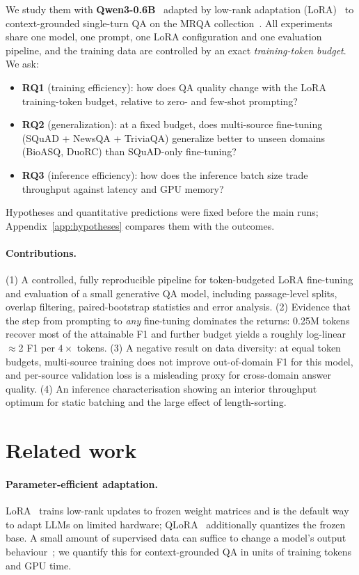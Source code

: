 \documentclass{article}
\newcommand{\RQ}[1]{\textbf{RQ#1}}
\begin{document}
We study them with \textbf{Qwen3-0.6B}~\citep{qwen3} adapted by low-rank adaptation
(LoRA)~\citep{hu2022lora} to context-grounded single-turn QA on the MRQA collection~\citep{fisch2019mrqa}.
All experiments share one model, one prompt, one LoRA configuration and one evaluation pipeline, and the
training data are controlled by an exact \emph{training-token budget}. We ask:
\begin{itemize}
  \item \RQ{1} (training efficiency): how does QA quality change with the LoRA training-token budget, relative to zero- and few-shot prompting?
  \item \RQ{2} (generalization): at a fixed budget, does multi-source fine-tuning (SQuAD + NewsQA + TriviaQA) generalize better to unseen domains (BioASQ, DuoRC) than SQuAD-only fine-tuning?
  \item \RQ{3} (inference efficiency): how does the inference batch size trade throughput against latency and GPU memory?
\end{itemize}
Hypotheses and quantitative predictions were fixed before the main runs; Appendix~\ref{app:hypotheses}
compares them with the outcomes.

\paragraph{Contributions.} (1) A controlled, fully reproducible pipeline for token-budgeted LoRA
fine-tuning and evaluation of a small generative QA model, including passage-level splits, overlap
filtering, paired-bootstrap statistics and error analysis. (2) Evidence that the step from prompting to
\emph{any} fine-tuning dominates the returns: 0.25M tokens recover most of the attainable F1 and further
budget yields a roughly log-linear $\approx$2 F1 per $4\times$ tokens. (3) A negative result on data
diversity: at equal token budgets, multi-source training does not improve out-of-domain F1 for this
model, and per-source validation loss is a misleading proxy for cross-domain answer quality.
(4) An inference characterisation showing an interior throughput optimum for static batching and the
large effect of length-sorting.

\section{Related work}
\label{sec:related}

\paragraph{Parameter-efficient adaptation.} LoRA~\citep{hu2022lora} trains low-rank updates to frozen
weight matrices and is the default way to adapt LLMs on limited hardware; QLoRA~\citep{dettmers2023qlora}
additionally quantizes the frozen base. A small amount of supervised data can suffice to change a
model's output behaviour~\citep{zhou2023lima}; we quantify this for context-grounded QA in units of
training tokens and GPU time.
\end{document}
